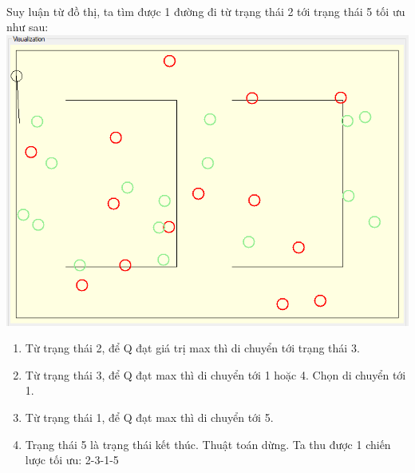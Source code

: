 \documentclass[14pt,a4paper,oneside]{report}		%
\begin{document}
\\
Suy luận từ đồ thị, ta tìm được 1 đường đi từ trạng thái 2 tới trạng thái 5 tối ưu như sau:
\includegraphics[width=\textwidth,height=\textheight,keepaspectratio]{6.png}
\begin{enumerate}
\item Từ trạng thái 2, để Q đạt giá trị max thì di chuyển tới trạng thái 3. 
\item Từ trạng thái 3, để Q đạt max thì di chuyển tới 1 hoặc 4. Chọn di chuyển tới 1.
\item Từ trạng thái 1, để Q đạt max thì di chuyển tới 5.
\item Trạng thái 5 là trạng thái kết thúc. Thuật toán dừng. Ta thu được 1 chiến lược tối ưu: 2-3-1-5
\end{enumerate}
\end{document}
